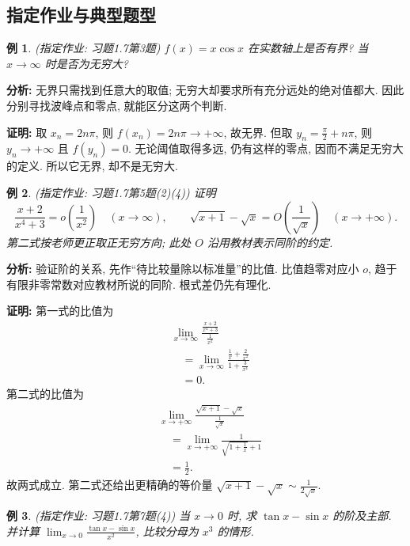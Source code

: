\documentclass[UTF8,openany]{ctexbook}
\theoremstyle{chinesetextbook}
\newtheorem{example}{例}[section]
\newenvironment{cnproof}{\par\indent\textbf{证明:} \ignorespaces}{\par}
\begin{document}
\subsection{指定作业与典型题型}
\begin{example}
(指定作业: 习题1.7第3题) $f(x)=x\cos x$ 在实数轴上是否有界? 当 $x\to\infty$ 时是否为无穷大?
\end{example}
\par\indent\textbf{分析:} 无界只需找到任意大的取值; 无穷大却要求所有充分远处的绝对值都大. 因此分别寻找波峰点和零点, 就能区分这两个判断.
\begin{cnproof}
取 $x_n=2n\pi$, 则 $f(x_n)=2n\pi\to+\infty$, 故无界. 但取 $\displaystyle y_n=\frac\pi2+n\pi$, 则 $y_n\to+\infty$ 且 $f(y_n)=0$. 无论阈值取得多远, 仍有这样的零点, 因而不满足无穷大的定义. 所以它无界, 却不是无穷大.
\end{cnproof}
\begin{example}
(指定作业: 习题1.7第5题(2)(4)) 证明
\[
\frac{x+2}{x^4+3}=o\!\left(\frac1{x^2}\right)\quad(x\to\infty),
\qquad
\sqrt{x+1}-\sqrt x=O\!\left(\frac1{\sqrt x}\right)\quad(x\to+\infty).
\]
第二式按老师更正取正无穷方向; 此处 $O$ 沿用教材表示同阶的约定.
\end{example}
\par\indent\textbf{分析:} 验证阶的关系, 先作“待比较量除以标准量”的比值. 比值趋零对应小 $o$, 趋于有限非零常数对应教材所说的同阶. 根式差仍先有理化.
\begin{cnproof}
第一式的比值为
\[
\begin{aligned}
&\lim_{x\to\infty}\frac{\frac{x+2}{x^4+3}}{\frac1{x^2}}\\
&\quad=\lim_{x\to\infty}\frac{\frac1x+\frac2{x^2}}{1+\frac3{x^4}}\\
&\quad=0.
\end{aligned}
\]
第二式的比值为
\[
\begin{aligned}
&\lim_{x\to+\infty}\frac{\sqrt{x+1}-\sqrt x}{\frac1{\sqrt x}}\\
&\quad=\lim_{x\to+\infty}\frac1{\sqrt{1+\frac1x}+1}\\
&\quad=\frac12.
\end{aligned}
\]
故两式成立. 第二式还给出更精确的等价量 $\displaystyle\sqrt{x+1}-\sqrt x\sim\frac1{2\sqrt x}$.
\end{cnproof}
\begin{example}
(指定作业: 习题1.7第7题(4)) 当 $x\to0$ 时, 求 $\tan x-\sin x$ 的阶及主部. 并计算 $\displaystyle\lim_{x\to0}\frac{\tan x-\sin x}{x^2}$, 比较分母为 $x^3$ 的情形.
\end{example}
\end{document}
